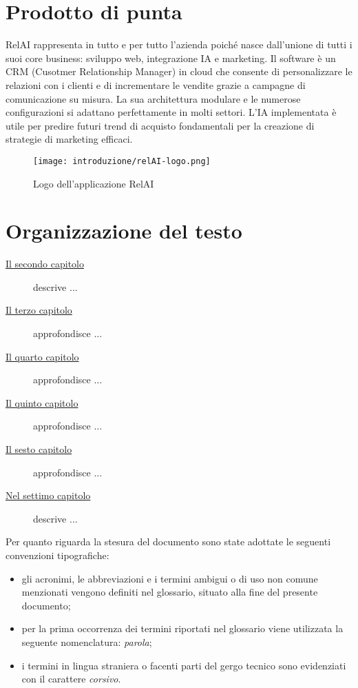 \newpage

\section{Prodotto di punta}
RelAI rappresenta in tutto e per tutto l'azienda poiché nasce dall'unione di tutti i suoi core business: sviluppo web, integrazione IA e marketing.
Il software è un CRM (Cusotmer Relationship Manager) in cloud che consente di personalizzare le relazioni con i clienti e di incrementare le vendite grazie a campagne di comunicazione su misura.
La sua architettura modulare e le numerose configurazioni si adattano perfettamente in molti settori. L'IA implementata è utile per predire futuri trend di acquisto fondamentali per la creazione di strategie di marketing efficaci. 


\begin{figure}[!h] 
  \centering 
  \texttt{[image: introduzione/relAI-logo.png]} 
  \caption{Logo dell'applicazione RelAI}
\end{figure}

\section{Organizzazione del testo}

\begin{description}
    \item[{\hyperref[cap:processi-metodologie]{Il secondo capitolo}}] descrive ...
    
    \item[{\hyperref[cap:descrizione-stage]{Il terzo capitolo}}] approfondisce ...
    
    \item[{\hyperref[cap:analisi-requisiti]{Il quarto capitolo}}] approfondisce ...
    
    \item[{\hyperref[cap:progettazione-codifica]{Il quinto capitolo}}] approfondisce ...
    
    \item[{\hyperref[cap:verifica-validazione]{Il sesto capitolo}}] approfondisce ...
    
    \item[{\hyperref[cap:conclusioni]{Nel settimo capitolo}}] descrive ...
\end{description}

Per quanto riguarda la stesura del documento sono state adottate le seguenti convenzioni tipografiche:
\begin{itemize}
	\item gli acronimi, le abbreviazioni e i termini ambigui o di uso non comune menzionati vengono definiti nel glossario, situato alla fine del presente documento;
	\item per la prima occorrenza dei termini riportati nel glossario viene utilizzata la seguente nomenclatura: \emph{parola}\glsfirstoccur;
	\item i termini in lingua straniera o facenti parti del gergo tecnico sono evidenziati con il carattere \emph{corsivo}.
\end{itemize}
